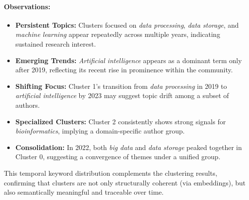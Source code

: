 \documentclass[10pt,a4paper]{article}
\begin{document}
\paragraph{Observations:}

\begin{itemize}
    \item \textbf{Persistent Topics:} Clusters focused on \textit{data processing}, \textit{data storage}, and \textit{machine learning} appear repeatedly across multiple years, indicating sustained research interest.
    
    \item \textbf{Emerging Trends:} \textit{Artificial intelligence} appears as a dominant term only after 2019, reflecting its recent rise in prominence within the community.

    \item \textbf{Shifting Focus:} Cluster 1's transition from \textit{data processing} in 2019 to \textit{artificial intelligence} by 2023 may suggest topic drift among a subset of authors.

    \item \textbf{Specialized Clusters:} Cluster 2 consistently shows strong signals for \textit{bioinformatics}, implying a domain-specific author group.

    \item \textbf{Consolidation:} In 2022, both \textit{big data} and \textit{data storage} peaked together in Cluster 0, suggesting a convergence of themes under a unified group.
\end{itemize}

This temporal keyword distribution complements the clustering results, confirming that clusters are not only structurally coherent (via embeddings), but also semantically meaningful and traceable over time.
\end{document}
